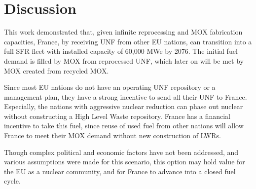 \section{Discussion}
This work demonstrated that, given infinite
reprocessing and \gls{MOX} fabrication capacities,
France, by receiving \gls{UNF} from other \gls{EU} nations,
 can transition into a full \gls{SFR} fleet
with installed capacity of 60,000 MWe by 2076.
The initial fuel demand is filled by \gls{MOX} from
reprocessed \gls{UNF}, which later on
will be met by \gls{MOX} created from recycled \gls{MOX}.

Since most \gls{EU} nations do not have an operating \gls{UNF}
repository or a management plan, they have a strong incentive
to send all their \gls{UNF} to France. Especially, the nations
with aggressive nuclear reduction can phase out nuclear
without constructing a High Level Waste repository. France has a financial
incentive to take this fuel, since reuse of used fuel from
other nations will allow France to meet their MOX demand
without new construction of \glspl{LWR}.

Though complex political and economic factors have not been
addressed, and various assumptions were made for this scenario,
this option may hold value for the \gls{EU} as a nuclear community,
and for France to advance into a closed fuel cycle.
